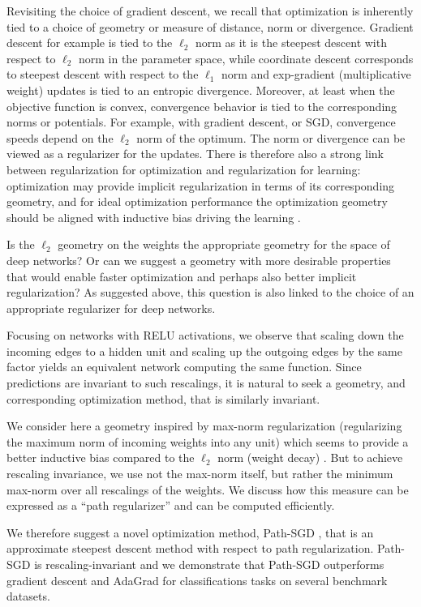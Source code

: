 \documentclass[11pt]{article}
\newcommand{\RSGD}{Path-SGD }
\begin{document}
Revisiting the choice of gradient descent, we recall that optimization
is inherently tied to a choice of geometry or measure of distance,
norm or divergence.  Gradient descent for example is tied to the
$\ell_2$ norm as it is the steepest descent with respect to $\ell_2$
norm in the parameter space, while coordinate descent corresponds to
steepest descent with respect to the $\ell_1$ norm and exp-gradient
(multiplicative weight) updates is tied to an entropic divergence.
Moreover, at least when the objective function is convex, convergence
behavior is tied to the corresponding norms or potentials. For example, with
gradient descent, or SGD, convergence speeds depend on the $\ell_2$
norm of the optimum.  The norm or divergence can be viewed as a
regularizer for the updates.  There is therefore also a strong link
between regularization for optimization and regularization for
learning: optimization may provide implicit regularization in terms of
its corresponding geometry, and for ideal optimization performance the
optimization geometry should be aligned with inductive bias driving
the learning \cite{srebro11}.

Is the $\ell_2$ geometry on the weights the appropriate geometry for
the space of deep networks?  Or can we suggest a geometry with more
desirable properties that would enable faster optimization and perhaps
also better implicit regularization?  As suggested above, this
question is also linked to the choice of an appropriate regularizer
for deep networks.  

Focusing on networks with RELU activations, we observe that scaling
down the incoming edges to a hidden unit and scaling up the outgoing
edges by the same factor yields an equivalent network computing the
same function.  Since predictions are invariant to such rescalings, it
is natural to seek a geometry, and corresponding optimization method,
that is similarly invariant.  

We consider here a geometry inspired by max-norm regularization
(regularizing the maximum norm of incoming weights into any unit)
which seems to provide a better inductive bias compared to the
$\ell_2$ norm (weight decay) \cite{goodfellow13,srivastava14}.  But to
achieve rescaling invariance, we use not the max-norm itself, but
rather the minimum max-norm over all rescalings of the weights.  We
discuss how this measure can be expressed as a ``path regularizer''
and can be computed efficiently.

We therefore suggest a novel optimization method, \RSGD, that is an
approximate steepest descent method with respect to path
regularization.  \RSGD is rescaling-invariant and we demonstrate that
\RSGD outperforms gradient descent and AdaGrad for classifications
tasks on several benchmark datasets.
\end{document}
